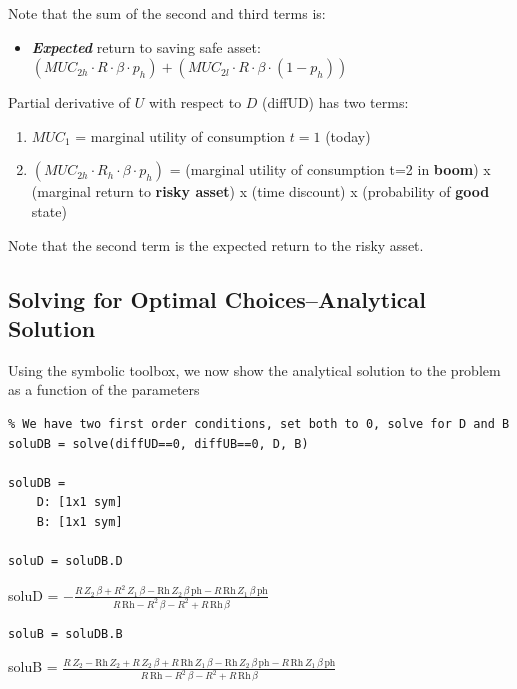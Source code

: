 \documentclass[
]{book}
\providecommand{\tightlist}{%
  \setlength{\itemsep}{0pt}\setlength{\parskip}{0pt}}
\begin{document}
Note that the sum of the second and third terms is:

\begin{itemize}
\tightlist
\item
  \textbf{\emph{Expected}} return to saving safe asset:
  \((MUC_{2h} \cdot R\cdot \beta \cdot p_h )+(MUC_{2l} \cdot R\cdot \beta \cdot (1-p_h ))\)
\end{itemize}

Partial derivative of \(U\) with respect to \(D\) (diffUD) has two terms:

\begin{enumerate}
\def\labelenumi{\arabic{enumi}.}
\item
  \(MUC_1\) = marginal utility of consumption \(t=1\) (today)
\item
  \((MUC_{2h} \cdot R_h \cdot \beta \cdot p_h )\) = (marginal utility of
  consumption t=2 in \textbf{boom}) x (marginal return to \textbf{risky asset})
  x (time discount) x (probability of \textbf{good} state)
\end{enumerate}

Note that the second term is the expected return to the risky asset.

\hypertarget{solving-for-optimal-choicesanalytical-solution}{%
\subsection{Solving for Optimal Choices--Analytical Solution}\label{solving-for-optimal-choicesanalytical-solution}}

Using the symbolic toolbox, we now show the analytical solution to the
problem as a function of the parameters

\begin{verbatim}
% We have two first order conditions, set both to 0, solve for D and B
soluDB = solve(diffUD==0, diffUB==0, D, B)

soluDB = 
    D: [1x1 sym]
    B: [1x1 sym]

soluD = soluDB.D
\end{verbatim}

soluD =
\(\displaystyle -\frac{R\,Z_2 \,\beta +R^2 \,Z_1 \,\beta -\textrm{Rh}\,Z_2 \,\beta \,\textrm{ph}-R\,\textrm{Rh}\,Z_1 \,\beta \,\textrm{ph}}{R\,\textrm{Rh}-R^2 \,\beta -R^2 +R\,\textrm{Rh}\,\beta }\)

\begin{verbatim}
soluB = soluDB.B
\end{verbatim}

soluB =
\(\displaystyle \frac{R\,Z_2 -\textrm{Rh}\,Z_2 +R\,Z_2 \,\beta +R\,\textrm{Rh}\,Z_1 \,\beta -\textrm{Rh}\,Z_2 \,\beta \,\textrm{ph}-R\,\textrm{Rh}\,Z_1 \,\beta \,\textrm{ph}}{R\,\textrm{Rh}-R^2 \,\beta -R^2 +R\,\textrm{Rh}\,\beta }\)
\end{document}
